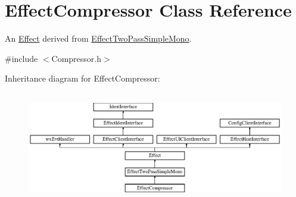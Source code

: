 \hypertarget{class_effect_compressor}{}\section{Effect\+Compressor Class Reference}
\label{class_effect_compressor}


An \hyperlink{class_effect}{Effect} derived from \hyperlink{class_effect_two_pass_simple_mono}{Effect\+Two\+Pass\+Simple\+Mono}.  




{\ttfamily \#include $<$Compressor.\+h$>$}

Inheritance diagram for Effect\+Compressor\+:\begin{figure}[H]
\begin{center}
\leavevmode
\includegraphics[height=4.883721cm]{class_effect_compressor}
\end{center}
\end{figure}
